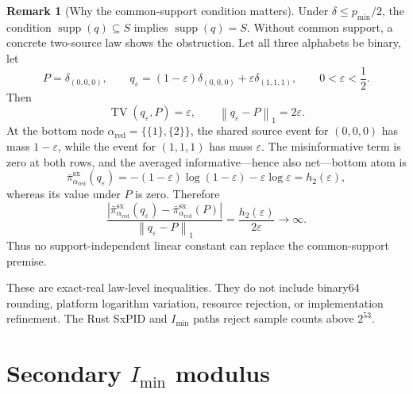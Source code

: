 \documentclass[11pt]{article}
\theoremstyle{definition}
\newtheorem{remark}[theorem]{Remark}
\newcommand{\supp}{\operatorname{supp}}
\newcommand{\normone}[1]{\left\lVert #1\right\rVert_1}
\newcommand{\sx}{\mathrm{sx}}
\newcommand{\imin}{I_{\min}}
\begin{document}
\begin{remark}[Why the common-support condition matters]
Under $\delta\le p_{\min}/2$, the condition $\supp(q)\subseteq S$ implies $\supp(q)=S$.  Without
common support, a concrete two-source law shows the obstruction.  Let all three alphabets be
binary, let
\[
  P=\delta_{(0,0,0)},
  \qquad
  q_\varepsilon
    =(1-\varepsilon)\delta_{(0,0,0)}
     +\varepsilon\delta_{(1,1,1)},
  \qquad 0<\varepsilon<\frac12.
\]
Then
\[
  \operatorname{TV}(q_\varepsilon,P)=\varepsilon,
  \qquad
  \normone{q_\varepsilon-P}=2\varepsilon.
\]
At the bottom node $\alpha_{\mathrm{red}}=\{\{1\},\{2\}\}$, the shared source event for
$(0,0,0)$ has mass $1-\varepsilon$, while the event for $(1,1,1)$ has mass $\varepsilon$.
The misinformative term is zero at both rows, and the averaged informative---hence also net---bottom
atom is
\[
  \bar\pi^\sx_{\alpha_{\mathrm{red}}}(q_\varepsilon)
  =-(1-\varepsilon)\log(1-\varepsilon)-\varepsilon\log\varepsilon
  =h_2(\varepsilon),
\]
whereas its value under $P$ is zero.  Therefore
\[
  \frac{
    \left|\bar\pi^\sx_{\alpha_{\mathrm{red}}}(q_\varepsilon)
          -\bar\pi^\sx_{\alpha_{\mathrm{red}}}(P)\right|
  }{\normone{q_\varepsilon-P}}
  =\frac{h_2(\varepsilon)}{2\varepsilon}
  \longrightarrow\infty.
\]
Thus no support-independent linear constant can replace the common-support premise.
\end{remark}

These are exact-real law-level inequalities.  They do not include binary64 rounding, platform
logarithm variation, resource rejection, or implementation refinement.  The Rust SxPID and $\imin$
paths reject sample counts above $2^{53}$.

\section{Secondary \texorpdfstring{$\imin$}{I-min} modulus}
\end{document}
